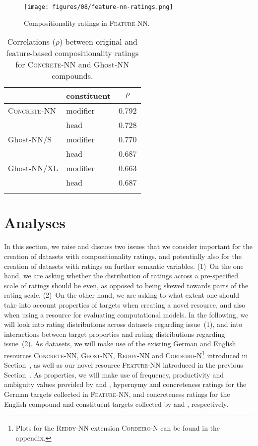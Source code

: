 \documentclass[output=paper,colorlinks,citecolor=brown]{langscibook}
\begin{document}
\begin{figure}
\label{page:comp-ratings-feature}
    \centering
    \texttt{[image: figures/08/feature-nn-ratings.png]}
    \caption{Compositionality ratings in \textsc{Feature-NN}.}
    \label{fig:feature-nn-comp-ratings}
\end{figure}

\begin{table}
\caption{Correlations ($\rho$) between original and feature-based compositionality ratings for \textsc{Concrete-NN} and Ghost-NN compounds.}
\label{tab:corr-comp-orig-feature}
\begin{tabular}{llc}
\lsptoprule
& constituent & $\rho$ \\\midrule
\textsc{Concrete-NN} & modifier & 0.792 \\
                     & head & 0.728 \\\addlinespace

Ghost-NN/S & modifier & 0.770 \\
           & head & 0.687 \\\addlinespace
  
Ghost-NN/XL & modifier & 0.663 \\
            & head     & 0.687 \\
\lspbottomrule
\end{tabular}
\end{table}

\section{Analyses}
\label{sec:analysis}

In this section, we raise and discuss two issues that we consider important for the creation of datasets with compositionality ratings, and potentially also for the creation of datasets with ratings on further semantic variables. (1)~On the one hand, we are asking whether the distribution of ratings across a pre-specified scale of ratings should be even, as opposed to being skewed towards parts of the rating scale. (2)~On the other hand, we are asking to what extent one should take into account properties of targets when creating a novel resource, and also when using a resource for evaluating computational models. In the following, we will look into rating distributions across datasets regarding issue~(1), and into interactions between target properties and rating distributions regarding issue~(2). As datasets, we will make use of the existing German and English resources \textsc{Concrete-NN, Ghost-NN, Reddy-NN} and \textsc{Cordeiro-N}\footnote{Plots for the \textsc{Reddy-NN} extension \textsc{Cordeiro-N} can be found in the appendix.} introduced in Section~, as well as our novel resource \textsc{Feature-NN} introduced in the previous Section~. As properties, we will make use of frequency, productivity and ambiguity values provided by \citet{SchulteImWaldeEtAl:16b} and \citet{Miletic/SchulteImWalde:23}, hypernymy and concreteness ratings for the German targets collected in \textsc{Feature-NN}, and concreteness ratings for the English compound and constituent targets collected by \citet{MurakiEtAl:22} and \citet{BrysbaertEtAl:14}, respectively.
\end{document}

